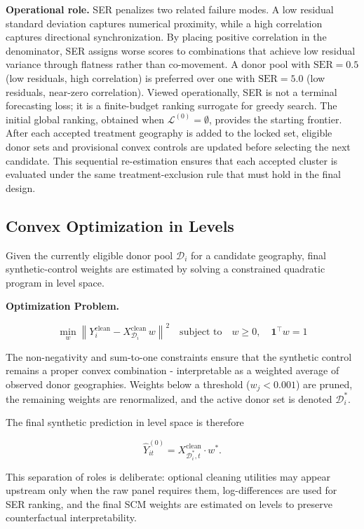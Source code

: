 \documentclass[11pt]{article}
\begin{document}
\textbf{Operational role.} SER penalizes two related failure modes. A low residual standard deviation captures numerical proximity, while a high correlation captures directional synchronization. By placing positive correlation in the denominator, SER assigns worse scores to combinations that achieve low residual variance through flatness rather than co-movement. A donor pool with $\mathrm{SER} = 0.5$ (low residuals, high correlation) is preferred over one with $\mathrm{SER} = 5.0$ (low residuals, near-zero correlation). Viewed operationally, SER is not a terminal forecasting loss; it is a finite-budget ranking surrogate for greedy search. The initial global ranking, obtained when $\mathcal{L}^{(0)} = \emptyset$, provides the starting frontier. After each accepted treatment geography is added to the locked set, eligible donor sets and provisional convex controls are updated before selecting the next candidate. This sequential re-estimation ensures that each accepted cluster is evaluated under the same treatment-exclusion rule that must hold in the final design.
\subsection{Convex Optimization in Levels}
Given the currently eligible donor pool $\mathcal{D}_i$ for a candidate geography, final synthetic-control weights are estimated by solving a constrained quadratic program in level space.

\textbf{Optimization Problem.}

\[
\min_{w} \left\| Y_i^{\mathrm{clean}} - X_{\mathcal{D}_i}^{\mathrm{clean}} \, w \right\|^2 \quad \text{subject to} \quad w \geq 0, \quad \mathbf{1}^\top w = 1
\]

The non-negativity and sum-to-one constraints ensure that the synthetic control remains a proper convex combination - interpretable as a weighted average of observed donor geographies. Weights below a threshold ($w_j < 0.001$) are pruned, the remaining weights are renormalized, and the active donor set is denoted $\mathcal{D}_i^*$.

The final synthetic prediction in level space is therefore

\[
\hat{Y}_{it}^{(0)} = X_{\mathcal{D}_i^*,t}^{\mathrm{clean}} \cdot w^*.
\]

This separation of roles is deliberate: optional cleaning utilities may appear upstream only when the raw panel requires them, log-differences are used for SER ranking, and the final SCM weights are estimated on levels to preserve counterfactual interpretability.
\end{document}

